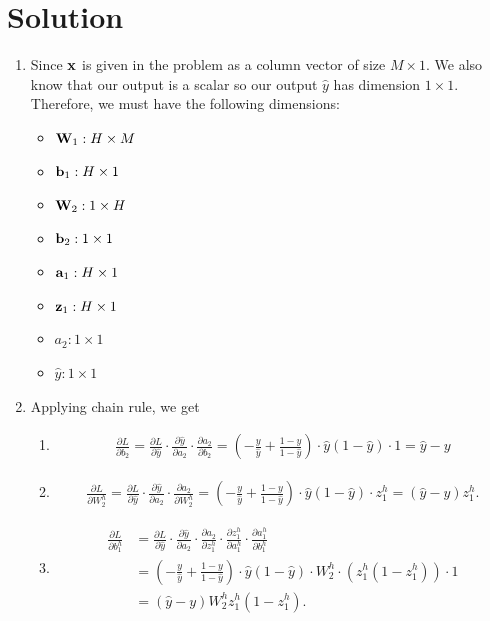 \documentclass[submit]{../harvardml}
\newenvironment{answer}
  {\section*{Solution}}
{}
\begin{document}
\begin{answer}
  \begin{enumerate}
    \item Since $\bold{x}$ is given in the problem as a column vector of size $M \times 1$. We also know that our output is a scalar so our output $\hat y$  has dimension $1 \times 1$.  Therefore, we must have the following dimensions:
    \begin{itemize}
            \item $\bold{W}_1 : H \times M$
            \item $\bold{b}_1 : H \times 1$
            \item $\bold{W}_2 : 1 \times H$
            \item $\bold{b}_2 : 1 \times 1$
            \item $\bold{a}_1 : H \times 1$
            \item $\bold{z}_1 : H \times 1$
            \item $a_2 : 1 \times 1$
            \item $\hat{y} : 1 \times 1$
          \end{itemize}

    \item Applying chain rule, we get
        \begin{enumerate}
            \item
                  \begin{align*}
                    \frac{\partial L}{\partial b_2} = \frac{\partial L}{\partial \hat{y}} \cdot \frac{\partial \hat{y}}{\partial a_2} \cdot \frac{\partial a_2}{\partial b_2} = \left(-\frac{y}{\hat{y}} + \frac{1-y}{1-\hat{y}}\right)
                    \cdot \hat{y}(1-\hat{y}) \cdot 1 = \hat{y}-y
                  \end{align*}

            \item
                  \begin{align*}
                    \frac{\partial L}{\partial W_2^h} = \frac{\partial L}{\partial \hat{y}} \cdot \frac{\partial \hat{y}}{\partial a_2} \cdot \frac{\partial a_2}{\partial W_2^h} = \left(-\frac{y}{\hat{y}} + \frac{1-y}{1-\hat{y}}\right)
                    \cdot \hat{y}(1-\hat{y}) \cdot z_1^h = (\hat{y}-y) z_1^h.
                  \end{align*}

            \item
                  \begin{align*}
                    \frac{\partial L}{\partial b_1^h} 
                    &= \frac{\partial L}{\partial \hat{y}} \cdot \frac{\partial \hat{y}}{\partial a_2} \cdot \frac{\partial a_2}{\partial z_1^h} \cdot \frac{\partial z_1^h}{\partial a_1^h} \cdot \frac{\partial a_1^h}{\partial b_1^h} \\
                    &= \left(-\frac{y}{\hat{y}} + \frac{1-y}{1-\hat{y}}\right)
                    \cdot \hat{y}(1-\hat{y}) \cdot W_2^h \cdot \left(z_1^h(1-z_1^h)\right) \cdot 1 \\
                    &= (\hat{y}-y) W_2^h  z_1^h (1-z_1^h).
                  \end{align*}


\end{enumerate}
\end{enumerate}
\end{answer}
\end{document}
